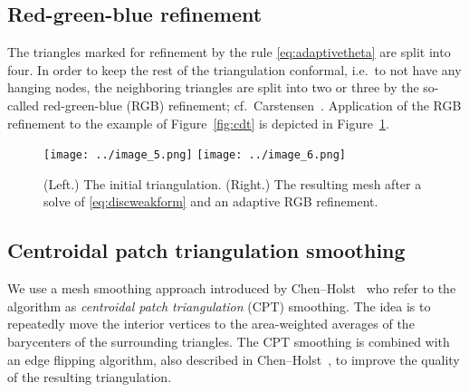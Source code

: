 \documentclass[11pt]{article}
\begin{document}

\subsection{Red-green-blue refinement}
\label{sec:rgb}

The triangles marked for refinement by the rule \eqref{eq:adaptivetheta} are
split into four.  In order to keep the rest of the triangulation conformal,
i.e.~to not have any hanging nodes, the neighboring triangles are split into two or
three by the so-called red-green-blue (RGB)
refinement; cf.~Carstensen~\cite{carstensen2004adaptive}.
Application of the RGB refinement to the example of Figure~\ref{fig:cdt}
is depicted in Figure~\ref{fig:firstrgb}.


\begin{figure}[htbp]
\centering
\texttt{[image: ../image\_5.png]}
\texttt{[image: ../image\_6.png]}
\caption{(Left.) The initial triangulation. (Right.) The resulting mesh
after a solve of \eqref{eq:discweakform} and an adaptive RGB refinement.}
\label{fig:firstrgb}
\end{figure}

\subsection{Centroidal patch triangulation smoothing}
\label{sec:cpt}

We use a mesh smoothing approach introduced by Chen--Holst~\cite{Chen_2011} who
refer to the algorithm as \emph{centroidal patch triangulation} (CPT) smoothing.
The idea is to repeatedly move the interior vertices to the area-weighted
averages of the barycenters of the surrounding triangles.
The CPT smoothing is combined with an edge flipping
algorithm, also described in Chen--Holst~\cite{Chen_2011},
to improve the quality of the resulting triangulation.
\end{document}
